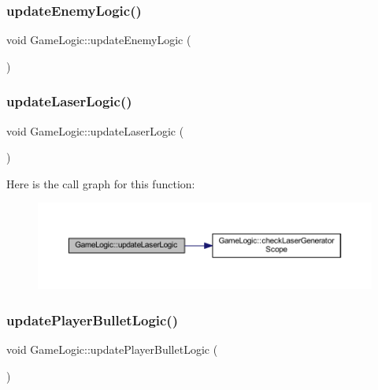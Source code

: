 \subsubsection{\texorpdfstring{update\+Enemy\+Logic()}{updateEnemyLogic()}}
{\footnotesize\ttfamily void Game\+Logic\+::update\+Enemy\+Logic (\begin{DoxyParamCaption}{ }\end{DoxyParamCaption})}

\mbox{\label{class_game_logic_ae7b71b5f335308748366385de5c0d88a}} 
\subsubsection{\texorpdfstring{update\+Laser\+Logic()}{updateLaserLogic()}}
{\footnotesize\ttfamily void Game\+Logic\+::update\+Laser\+Logic (\begin{DoxyParamCaption}{ }\end{DoxyParamCaption})}

Here is the call graph for this function\+:\nopagebreak
\begin{figure}[H]
\begin{center}
\leavevmode
\includegraphics[width=350pt]{class_game_logic_ae7b71b5f335308748366385de5c0d88a_cgraph}
\end{center}
\end{figure}
\mbox{\label{class_game_logic_abe02a85cda082eea7d0dc758d8fe3082}} 
\subsubsection{\texorpdfstring{update\+Player\+Bullet\+Logic()}{updatePlayerBulletLogic()}}
{\footnotesize\ttfamily void Game\+Logic\+::update\+Player\+Bullet\+Logic (\begin{DoxyParamCaption}{ }\end{DoxyParamCaption})}


